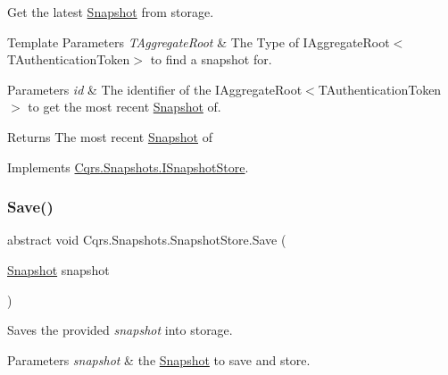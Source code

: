 Get the latest \hyperlink{classCqrs_1_1Snapshots_1_1Snapshot}{Snapshot} from storage. 


\begin{DoxyTemplParams}{Template Parameters}
{\em T\+Aggregate\+Root} & The Type of I\+Aggregate\+Root$<$\+T\+Authentication\+Token$>$ to find a snapshot for.\\
\hline
\end{DoxyTemplParams}

\begin{DoxyParams}{Parameters}
{\em id} & The identifier of the I\+Aggregate\+Root$<$\+T\+Authentication\+Token$>$ to get the most recent \hyperlink{classCqrs_1_1Snapshots_1_1Snapshot}{Snapshot} of.\\
\hline
\end{DoxyParams}
\begin{DoxyReturn}{Returns}
The most recent \hyperlink{classCqrs_1_1Snapshots_1_1Snapshot}{Snapshot} of
\end{DoxyReturn}


Implements \hyperlink{interfaceCqrs_1_1Snapshots_1_1ISnapshotStore_ab7bd163fc9cd5c3bd5911679030be403_ab7bd163fc9cd5c3bd5911679030be403}{Cqrs.\+Snapshots.\+I\+Snapshot\+Store}.

\mbox{\label{classCqrs_1_1Snapshots_1_1SnapshotStore_ae96ea2bb89a0bd7f45544acc37107525_ae96ea2bb89a0bd7f45544acc37107525}} 
\subsubsection{\texorpdfstring{Save()}{Save()}}
{\footnotesize\ttfamily abstract void Cqrs.\+Snapshots.\+Snapshot\+Store.\+Save (\begin{DoxyParamCaption}\item[{\hyperlink{classCqrs_1_1Snapshots_1_1Snapshot}{Snapshot}}]{snapshot }\end{DoxyParamCaption})\hspace{0.3cm}{\ttfamily [pure virtual]}}



Saves the provided {\itshape snapshot}  into storage. 


\begin{DoxyParams}{Parameters}
{\em snapshot} & the \hyperlink{classCqrs_1_1Snapshots_1_1Snapshot}{Snapshot} to save and store.\\
\hline
\end{DoxyParams}


